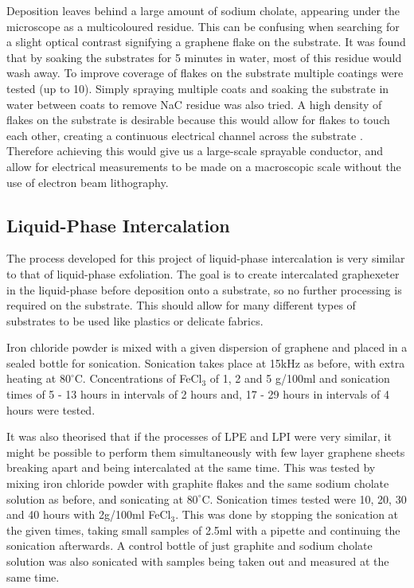 \documentclass[12pt,titlepage]{article}
\begin{document}
	Deposition leaves behind a large amount of sodium cholate, appearing under the microscope as a multicoloured residue. This can be confusing when searching for a slight optical contrast signifying a graphene flake on the substrate. It was found that by soaking the substrates for 5 minutes in water, most of this residue would wash away. To improve coverage of flakes on the substrate multiple coatings were tested (up to 10). Simply spraying multiple coats and soaking the substrate in water between coats to remove NaC residue was also tried. A high density of flakes on the substrate is desirable because this would allow for flakes to touch each other, creating a continuous electrical channel across the substrate \cite{De2010}. Therefore achieving this would give us a large-scale sprayable conductor, and allow for electrical measurements to be made on a macroscopic scale without the use of electron beam lithography.
		
	\subsection{Liquid-Phase Intercalation}
	The process developed for this project of liquid-phase intercalation is very similar to that of liquid-phase exfoliation. The goal is to create intercalated graphexeter in the liquid-phase before deposition onto a substrate, so no further processing is required on the substrate. This should allow for many different types of substrates to be used like plastics or delicate fabrics.
	
	Iron chloride powder is mixed with a given dispersion of graphene and placed in a sealed bottle for sonication. Sonication takes place at 15kHz as before, with extra heating at $80^{\circ}$C. Concentrations of FeCl$_3$ of 1, 2 and 5 g/100ml and sonication times of 5 - 13 hours in intervals of 2 hours and, 17 - 29 hours in intervals of 4 hours were tested.
	
	It was also theorised that if the processes of LPE and LPI were very similar, it might be possible to perform them simultaneously with few layer graphene sheets breaking apart and being intercalated at the same time. This was tested by mixing iron chloride powder with graphite flakes and the same sodium cholate solution as before, and sonicating at $80^{\circ}$C. Sonication times tested were 10, 20, 30 and 40 hours with 2g/100ml FeCl$_3$. This was done by stopping the sonication at the given times, taking small samples of 2.5ml with a pipette and continuing the sonication afterwards. A control bottle of just graphite and sodium cholate solution was also sonicated with samples being taken out and measured at the same time.
	
\end{document}
